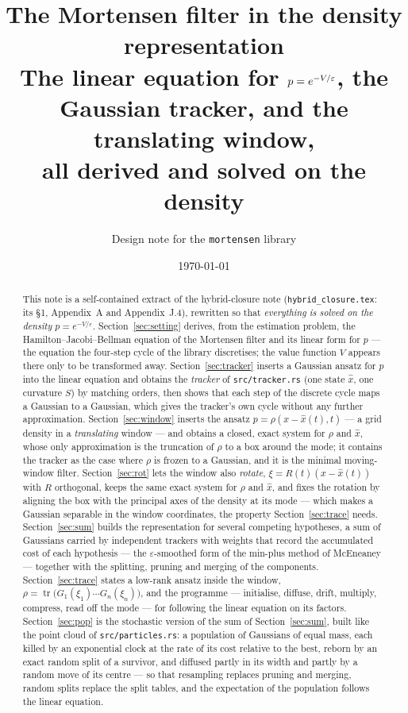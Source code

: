 \documentclass[11pt,a4paper]{article}
\title{The Mortensen filter in the density representation\\
\large The linear equation for $p=e^{-V/\eps}$, the Gaussian tracker, and the translating window,\\
all derived and solved on the density}
\author{Design note for the \texttt{mortensen} library}
\date{\today}
\newcommand{\tr}{\operatorname{tr}}
\newcommand{\xh}{\hat{x}}
\newcommand{\eps}{\varepsilon}
\theoremstyle{plain}
\theoremstyle{definition}
\theoremstyle{remark}
\begin{document}
\maketitle

\begin{abstract}
This note is a self-contained extract of the hybrid-closure note (\texttt{hybrid\_closure.tex}: its \S1, Appendix~A and Appendix~J.4), rewritten so that \emph{everything is solved on the density} $p=e^{-V/\eps}$. Section~\ref{sec:setting} derives, from the estimation problem, the Hamilton--Jacobi--Bellman equation of the Mortensen filter and its linear form for $p$ --- the equation the four-step cycle of the library discretises; the value function $V$ appears there only to be transformed away. Section~\ref{sec:tracker} inserts a Gaussian ansatz for $p$ into the linear equation and obtains the \emph{tracker} of \texttt{src/tracker.rs} (one state $\xh$, one curvature $S$) by matching orders, then shows that each step of the discrete cycle maps a Gaussian to a Gaussian, which gives the tracker's own cycle without any further approximation. Section~\ref{sec:window} inserts the ansatz $p=\rho(x-\xh(t),t)$ --- a grid density in a \emph{translating} window --- and obtains a closed, exact system for $\rho$ and $\xh$, whose only approximation is the truncation of $\rho$ to a box around the mode; it contains the tracker as the case where $\rho$ is frozen to a Gaussian, and it is the minimal moving-window filter. Section~\ref{sec:rot} lets the window also \emph{rotate}, $\xi=R(t)(x-\xh(t))$ with $R$ orthogonal, keeps the same exact system for $\rho$ and $\xh$, and fixes the rotation by aligning the box with the principal axes of the density at its mode --- which makes a Gaussian separable in the window coordinates, the property Section~\ref{sec:trace} needs. Section~\ref{sec:sum} builds the representation for several competing hypotheses, a sum of Gaussians carried by independent trackers with weights that record the accumulated cost of each hypothesis --- the $\eps$-smoothed form of the min-plus method of McEneaney --- together with the splitting, pruning and merging of the components. Section~\ref{sec:trace} states a low-rank ansatz inside the window, $\rho=\tr\big(G_1(\xi_1)\cdots G_n(\xi_n)\big)$, and the programme --- initialise, diffuse, drift, multiply, compress, read off the mode --- for following the linear equation on its factors. Section~\ref{sec:pop} is the stochastic version of the sum of Section~\ref{sec:sum}, built like the point cloud of \texttt{src/particles.rs}: a population of Gaussians of equal mass, each killed by an exponential clock at the rate of its cost relative to the best, reborn by an exact random split of a survivor, and diffused partly in its width and partly by a random move of its centre --- so that resampling replaces pruning and merging, random splits replace the split tables, and the expectation of the population follows the linear equation.
\end{abstract}
\end{document}
